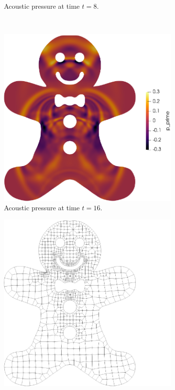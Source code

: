 \documentclass[hidelinks]{juliacon} %
\begin{document}
\begin{figure}[!h]
\begin{subfigure}{0.475\linewidth}
    \caption{Acoustic pressure at time $t = 8$.}
  \end{subfigure}%
  \\
  \begin{subfigure}{0.475\linewidth}
    \includegraphics[width=\textwidth]{../figures/ginger_time_16}
    \caption{Acoustic pressure at time $t = 16$.}
  \end{subfigure}%
  \hspace*{\fill}
  \begin{subfigure}{0.475\linewidth}
    \includegraphics[width=\textwidth]{../figures/ginger_mesh}

\end{subfigure}
\end{figure}
\end{document}
